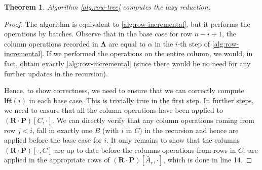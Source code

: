 \documentclass{article}
\newtheorem{theorem}{Theorem}[section]
\newcommand{\mat}[1]{\mathbf{#1}}
\newcommand{\lft}{\mathbf{lft}}
\begin{document}
\begin{theorem}
Algorithm \ref{alg:row-tree} computes the lazy reduction.
\end{theorem}
\begin{proof}
The algorithm is equivalent to \cref{alg:row-incremental}, but it performs the operations by batches. Observe that in the base case for row $n-i+1$, the column operations recorded in $\mat{\Lambda}$ are equal to $\alpha$ in the $i$-th step of \cref{alg:row-incremental}. If we performed the operations on the entire column, we would, in fact, obtain exactly \cref{alg:row-incremental} (since there would be no need for any further updates in the recursion). 

Hence, to show correctness, we need to ensure that we can correctly compute $\lft(i)$ in each base case. This is trivially true in the first step. In further steps, we need to ensure that all the column operations have been applied to $(\mat{R}\cdot \mat{P})[C,\cdot]$. We can directly verify that any column operations coming from row $j<i$, fall in exactly one $B$ (with $i$ in $C$) in the recursion and hence are applied before the base case for $i$.
%
It only remains to show that the columns $(\mat{R}\cdot \mat{P})[\cdot,C]$ are up to date before the columns operations from rows in $C_r$ are applied in the appropriate rows of $(\mat{R}\cdot \mat{P})[\bar{A}_r,\cdot]$, which is done in line 14. 
\end{proof}
\end{document}
